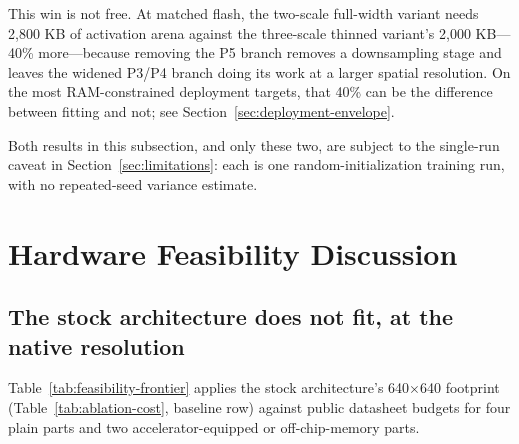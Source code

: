 \documentclass[11pt]{article}
\begin{document}
This win is not free. At matched flash, the two-scale full-width variant
needs 2{,}800 KB of activation arena against the three-scale thinned
variant's 2{,}000 KB---40\% more---because removing the P5 branch removes a
downsampling stage and leaves the widened P3/P4 branch doing its work at a
larger spatial resolution. On the most RAM-constrained deployment targets,
that 40\% can be the difference between fitting and not; see
Section~\ref{sec:deployment-envelope}.

Both results in this subsection, and only these two, are subject to the
single-run caveat in Section~\ref{sec:limitations}: each is one
random-initialization training run, with no repeated-seed variance estimate.

\section{Hardware Feasibility Discussion}
\label{sec:hw-feasibility}

\subsection{The stock architecture does not fit, at the native resolution}

Table~\ref{tab:feasibility-frontier} applies the stock architecture's
640$\times$640 footprint (Table~\ref{tab:ablation-cost}, baseline row) against
public datasheet budgets for four plain parts and two accelerator-equipped or
off-chip-memory parts.

\begin{table}[h]
\centering
{}
\caption{Feasibility of the \emph{stock} architecture, swept over input
resolution, against each target's on-chip budget. None of the three plain
STM32 parts fit at any resolution; the three that do fit all rely on
off-chip memory, an accelerator, or both.}
\label{tab:feasibility-frontier}
\end{table}
\end{document}
